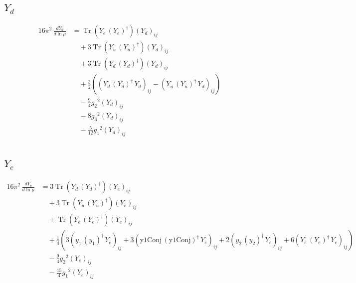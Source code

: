 \documentclass[10pt,a4paper]{article}
\begin{document}
\subsection*{$Y_d$}
\begin{align*}
16\pi^2\,\frac{d Y_d}{d\ln\mu} &=\operatorname{Tr}\!\left({Y_e}\,\left({Y_e}\right)^{\dagger}\right) \left({Y_d}\right)_{ij} \\
&\quad +3 \operatorname{Tr}\!\left({Y_u}\,\left({Y_u}\right)^{\dagger}\right) \left({Y_d}\right)_{ij} \\
&\quad +3 \operatorname{Tr}\!\left({Y_d}\,\left({Y_d}\right)^{\dagger}\right) \left({Y_d}\right)_{ij} \\
&\quad +\frac{3}{2} (\left({Y_d}\,\left({Y_d}\right)^{\dagger}\,{Y_d}\right)_{ij}-\left({Y_u}\,\left({Y_u}\right)^{\dagger}\,{Y_d}\right)_{ij}) \\
&\quad -\frac{9}{4} {g_2}^2 \left({Y_d}\right)_{ij} \\
&\quad -8 {g_3}^2 \left({Y_d}\right)_{ij} \\
&\quad -\frac{5}{12} {g_1}^2 \left({Y_d}\right)_{ij} \\
\end{align*}
\subsection*{$Y_e$}
\begin{align*}
16\pi^2\,\frac{d Y_e}{d\ln\mu} &=3 \operatorname{Tr}\!\left({Y_d}\,\left({Y_d}\right)^{\dagger}\right) \left({Y_e}\right)_{ij} \\
&\quad +3 \operatorname{Tr}\!\left({Y_u}\,\left({Y_u}\right)^{\dagger}\right) \left({Y_e}\right)_{ij} \\
&\quad +\operatorname{Tr}\!\left({Y_e}\,\left({Y_e}\right)^{\dagger}\right) \left({Y_e}\right)_{ij} \\
&\quad +\frac{1}{4} (3 \left({y_1}\,\left({y_1}\right)^{\dagger}\,{Y_e}\right)_{ij}+3 \left(\text{y1Conj}\,\left(\text{y1Conj}\right)^{\dagger}\,{Y_e}\right)_{ij}+2 \left({y_2}\,\left({y_2}\right)^{\dagger}\,{Y_e}\right)_{ij}+6 \left({Y_e}\,\left({Y_e}\right)^{\dagger}\,{Y_e}\right)_{ij}) \\
&\quad -\frac{9}{4} {g_2}^2 \left({Y_e}\right)_{ij} \\
&\quad -\frac{15}{4} {g_1}^2 \left({Y_e}\right)_{ij} \\
\end{align*}
\end{document}
